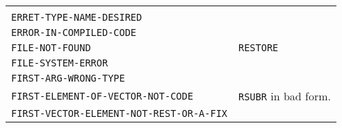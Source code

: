 \documentclass[a4paper,]{article}
\begin{document}
\begin{longtable}[]{@{}ll@{}}
\begin{minipage}[t]{0.36\columnwidth}
\strut
\end{minipage}\tabularnewline
\begin{minipage}[t]{0.58\columnwidth}\raggedright\strut
\texttt{ERRET-TYPE-NAME-DESIRED}\strut
\end{minipage} & \begin{minipage}[t]{0.36\columnwidth}\raggedright\strut
\strut
\end{minipage}\tabularnewline
\begin{minipage}[t]{0.58\columnwidth}\raggedright\strut
\texttt{ERROR-IN-COMPILED-CODE}\strut
\end{minipage} & \begin{minipage}[t]{0.36\columnwidth}\raggedright\strut
\strut
\end{minipage}\tabularnewline
\begin{minipage}[t]{0.58\columnwidth}\raggedright\strut
\texttt{FILE-NOT-FOUND}\strut
\end{minipage} & \begin{minipage}[t]{0.36\columnwidth}\raggedright\strut
\texttt{RESTORE}\strut
\end{minipage}\tabularnewline
\begin{minipage}[t]{0.58\columnwidth}\raggedright\strut
\texttt{FILE-SYSTEM-ERROR}\strut
\end{minipage} & \begin{minipage}[t]{0.36\columnwidth}\raggedright\strut
\strut
\end{minipage}\tabularnewline
\begin{minipage}[t]{0.58\columnwidth}\raggedright\strut
\texttt{FIRST-ARG-WRONG-TYPE}\strut
\end{minipage} & \begin{minipage}[t]{0.36\columnwidth}\raggedright\strut
\strut
\end{minipage}\tabularnewline
\begin{minipage}[t]{0.58\columnwidth}\raggedright\strut
\texttt{FIRST-ELEMENT-OF-VECTOR-NOT-CODE}\strut
\end{minipage} & \begin{minipage}[t]{0.36\columnwidth}\raggedright\strut
\texttt{RSUBR} in bad form.\strut
\end{minipage}\tabularnewline
\begin{minipage}[t]{0.58\columnwidth}\raggedright\strut
\texttt{FIRST-VECTOR-ELEMENT-NOT-REST-OR-A-FIX}\strut
\end{minipage} & \begin{minipage}[t]{0.36\columnwidth}\raggedright\strut

\end{minipage}
\end{longtable}
\end{document}
